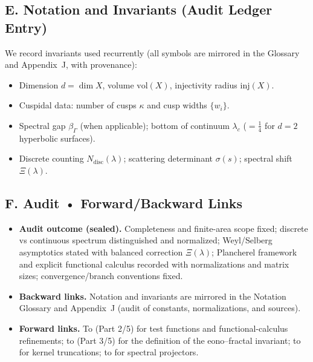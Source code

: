 \subsection*{E. Notation and Invariants (Audit Ledger Entry)}
\label{subsec:notation-invariants}

We record invariants used recurrently (all symbols are mirrored in the Glossary and Appendix~J, with provenance):
\begin{itemize}
  \item Dimension $d=\dim X$, volume $\mathrm{vol}(X)$, injectivity radius $\mathrm{inj}(X)$.
  \item Cuspidal data: number of cusps $\kappa$ and cusp widths $\{w_i\}$.
  \item Spectral gap $\beta_\Gamma$ (when applicable); bottom of continuum $\lambda_c$ ($=\tfrac14$ for $d=2$ hyperbolic surfaces).
  \item Discrete counting $N_{\mathrm{disc}}(\lambda)$; scattering determinant $\sigma(s)$; spectral shift $\Xi(\lambda)$.
\end{itemize}

\subsection*{F. Audit • Forward/Backward Links}
\label{subsec:audit-links}

\begin{itemize}
  \item \textbf{Audit outcome (sealed).}
        Completeness and finite-area scope fixed; discrete vs continuous spectrum distinguished and normalized; Weyl/Selberg asymptotics stated with balanced correction $\Xi(\lambda)$; Plancherel framework and explicit functional calculus recorded with normalizations and matrix sizes; convergence/branch conventions fixed.
  \item \textbf{Backward links.}
        Notation and invariants are mirrored in the Notation Glossary and Appendix~J (audit of constants, normalizations, and sources).
  \item \textbf{Forward links.}
        To  (Part 2/5) for test functions and functional-calculus refinements;
        to  (Part 3/5) for the definition of the eono–fractal invariant;
        to  for kernel truncations; to  for spectral projectors.
\end{itemize}

